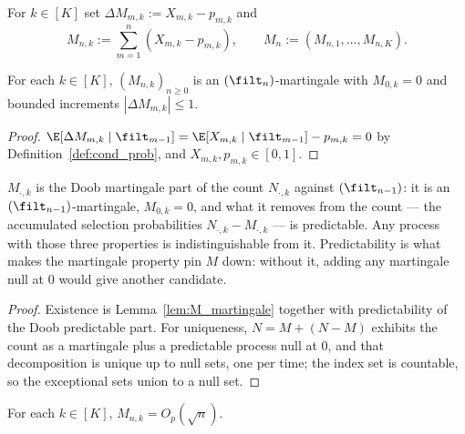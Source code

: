 \begin{definition}\label{def:M}
\leanok
{}
For $k \in [K]$ set $\Delta M_{m,k} := X_{m,k} - p_{m,k}$ and
\[
  M_{n,k} := \sum_{m=1}^n (X_{m,k} - p_{m,k}), \qquad M_n := (M_{n,1},\dots,M_{n,K}).
\]
\end{definition}

\begin{lemma}[$M$ is a martingale]\label{lem:M_martingale}
\leanok
{}
For each $k \in [K]$, $(M_{n,k})_{n\ge0}$ is an $(\filt_n)$-martingale with
$M_{0,k}=0$ and bounded increments $|\Delta M_{m,k}| \le 1$.
\end{lemma}

\begin{proof}\leanok
{}
$\E[\Delta M_{m,k}\mid\filt_{m-1}] = \E[X_{m,k}\mid\filt_{m-1}] - p_{m,k} = 0$
by Definition~\ref{def:cond_prob}, and $X_{m,k},p_{m,k}\in[0,1]$.
\end{proof}

\begin{lemma}\label{lem:M_unique}
$M_{\cdot,k}$ is the Doob martingale part of the count $N_{\cdot,k}$ against $(\filt_{n-1})$: it is
an $(\filt_{n-1})$-martingale, $M_{0,k}=0$, and what it removes from the count — the accumulated
selection probabilities $N_{\cdot,k}-M_{\cdot,k}$ — is predictable. Any process with those three
properties is indistinguishable from it. Predictability is what makes the martingale property pin
$M$ down: without it, adding any martingale null at $0$ would give another candidate.
\end{lemma}

\begin{proof}
Existence is Lemma~\ref{lem:M_martingale} together with predictability of the Doob predictable
part. For uniqueness, $N = M + (N-M)$ exhibits the count as a martingale plus a predictable process
null at $0$, and that decomposition is unique up to null sets, one per time; the index set is
countable, so the exceptional sets union to a null set.
\end{proof}

\begin{lemma}\label{lem:M_Op}
\leanok
{}
For each $k \in [K]$, $M_{n,k} = O_p(\sqrt n)$.
\end{lemma}

